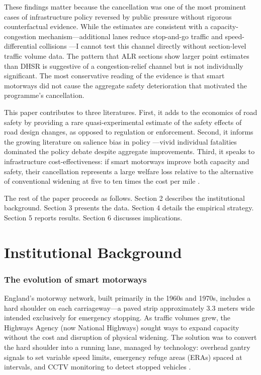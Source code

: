 \documentclass[12pt]{article}
\begin{document}
These findings matter because the cancellation was one of the most prominent cases of infrastructure policy reversed by public pressure without rigorous counterfactual evidence. While the estimates are consistent with a capacity-congestion mechanism---additional lanes reduce stop-and-go traffic and speed-differential collisions \citep{elvik_speed_2019}---I cannot test this channel directly without section-level traffic volume data. The pattern that ALR sections show larger point estimates than DHSR is suggestive of a congestion-relief channel but is not individually significant. The most conservative reading of the evidence is that smart motorways did not cause the aggregate safety deterioration that motivated the programme's cancellation.

This paper contributes to three literatures. First, it adds to the economics of road safety \citep{ashenfelter_speed_2004, deangelo_police_2017, anderson_minimum_2018} by providing a rare quasi-experimental estimate of the safety effects of road design changes, as opposed to regulation or enforcement. Second, it informs the growing literature on salience bias in policy \citep{bordalo_salience_2012}---vivid individual fatalities dominated the policy debate despite aggregate improvements. Third, it speaks to infrastructure cost-effectiveness: if smart motorways improve both capacity and safety, their cancellation represents a large welfare loss relative to the alternative of conventional widening at five to ten times the cost per mile \citep{national_highways_2023}.

The rest of the paper proceeds as follows. Section 2 describes the institutional background. Section 3 presents the data. Section 4 details the empirical strategy. Section 5 reports results. Section 6 discusses implications.


\section{Institutional Background}

\subsubsection*{The evolution of smart motorways} England's motorway network, built primarily in the 1960s and 1970s, includes a hard shoulder on each carriageway---a paved strip approximately 3.3 meters wide intended exclusively for emergency stopping. As traffic volumes grew, the Highways Agency (now National Highways) sought ways to expand capacity without the cost and disruption of physical widening. The solution was to convert the hard shoulder into a running lane, managed by technology: overhead gantry signals to set variable speed limits, emergency refuge areas (ERAs) spaced at intervals, and CCTV monitoring to detect stopped vehicles \citep{house_of_commons_2021}.
\end{document}
